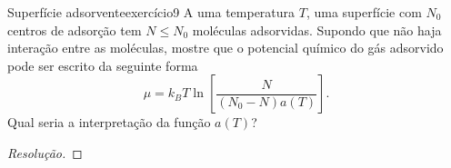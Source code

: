 \begin{exercício}{Superfície adsorvente}{exercício9}
    A uma temperatura \(T\), uma superfície com \(N_0\) centros de adsorção tem \(N \leq N_0\) moléculas adsorvidas. Supondo que não haja interação entre as moléculas, mostre que o potencial químico do gás adsorvido pode ser escrito da seguinte forma
    \begin{equation*}
        \mu = k_BT \ln\left[\frac{N}{(N_0 - N) a(T)}\right].
    \end{equation*}
    Qual seria a interpretação da função \(a(T)\)?
\end{exercício}
\begin{proof}[Resolução]

\end{proof}
